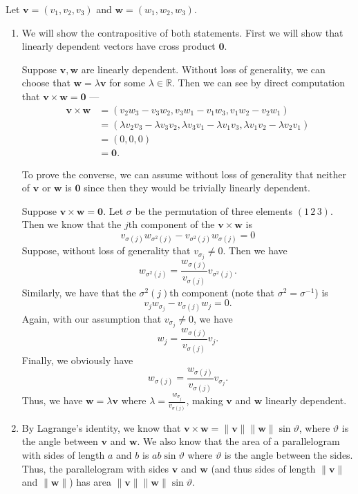 \documentclass[12 pt, letterpaper]{hmcpset}
\begin{document}
\begin{solution}
	Let $\mathbf{v} = (v_1, v_2, v_3)$ and $\mathbf{w} = (w_1, w_2, w_3)$.
	\begin{enumerate}
		\item
			We will show the contrapositive of both statements. First we will show that linearly dependent vectors have cross product $\mathbf{0}$. 

			Suppose $\mathbf{v}, \mathbf{w}$ are linearly dependent. Without loss of generality, we can choose that $\mathbf{w} = \lambda \mathbf{v}$ for some $\lambda \in \mathbb{R}$. Then we can see by direct computation that $\mathbf{v} \times \mathbf{w} = \mathbf{0}$ ---
			\[
				\begin{split}
					\mathbf{v} \times \mathbf{w} & = (v_2 w_3 - v_3 w_2, v_3 w_1 - v_1 w_3, v_1 w_2 - v_2 w_1) \\
								     & = (\lambda v_2 v_3 - \lambda v_3 v_2, \lambda v_3 v_1 - \lambda v_1 v_3, \lambda v_1 v_2 - \lambda v_2 v_1) \\
								     & = (0, 0, 0) \\
								     & = \mathbf{0}.
				\end{split}
			\] 

			To prove the converse, we can assume without loss of generality that neither of $\mathbf{v}$ or $\mathbf{w}$ is $\mathbf{0}$ since then they would be trivially linearly dependent. 

			Suppose $\mathbf{v} \times \mathbf{w} = \mathbf{0}$. Let $\sigma$ be the permutation of three elements $(1 \, 2 \, 3)$. Then we know that the $j$th component of the $\mathbf{v} \times \mathbf{w}$ is
			\[
				v_{\sigma(j)} w_{\sigma^2(j)} - v_{\sigma^2(j)} w_{\sigma(j)} = 0
			\]
			Suppose, without loss of generality that $v_{\sigma_j} \neq 0$. Then we have
			\[
				w_{\sigma^2(j)} = \frac{w_{\sigma(j)}}{v_{\sigma(j)}} v_{\sigma^2(j)}.
			\]
			Similarly, we have that the $\sigma^2(j)$th component (note that $\sigma^2 = \sigma^{-1}$) is
			\[
				v_j w_{\sigma_j} - v_{\sigma(j)} w_j = 0.
			\]
			Again, with our assumption that $v_{\sigma_j} \neq 0$, we have
			\[
				w_j = \frac{w_{\sigma(j)}}{v_{\sigma(j)}} v_j.
			\]
			Finally, we obviously have
			\[
				w_{\sigma(j)} = \frac{w_{\sigma(j)}}{v_{\sigma(j)}} v_{\sigma_j}.
			\]
			Thus, we have $\mathbf{w} = \lambda \mathbf{v}$ where $\lambda = \frac{w_{\sigma_j}}{v_{\sigma(j)}}$, making $\mathbf{v}$ and $\mathbf{w}$ linearly dependent.
		\item
			By Lagrange's identity, we know that $\mathbf{v} \times \mathbf{w} = \lVert \mathbf{v} \rVert \lVert \mathbf{w} \rVert \sin \vartheta$, where $\vartheta$ is the angle between $\mathbf{v}$ and $\mathbf{w}$. We also know that the area of a parallelogram with sides of length $a$ and $b$ is $ab \sin \vartheta$ where $\vartheta$ is the angle between the sides. Thus, the parallelogram with sides $\mathbf{v}$ and $\mathbf{w}$ (and thus sides of length $\lVert \mathbf{v} \rVert$ and $\lVert \mathbf{w} \rVert$) has area $\lVert \mathbf{v} \rVert \lVert \mathbf{w} \rVert \sin \vartheta$.
	\end{enumerate}
\end{solution}
\end{document}
